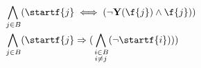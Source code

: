 \begin{align*}
%
% 
 \bigwedge_{
\begin{subarray}{c}
\,j \in B
\end{subarray}
}
&(\startf{j} \iff (\lnot \mathbf{Y}(\f{j}) \land \f{j}))\\
%
% 
%
\bigwedge_{
\begin{subarray}{c}
\,j \in B
\end{subarray}
}
&(\startf{j} \Rightarrow 
(
\bigwedge_{
	\begin{subarray}{c}
	\,i \in B \\
	i \neq j 
	\end{subarray}
}
(\lnot \startf{i})
))
%
\end{align*}


